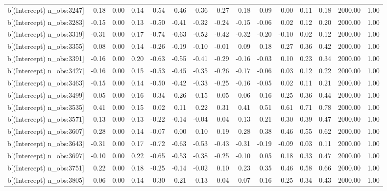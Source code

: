 \begin{table}[ht]
\begin{tabular}{rrrrrrrrrrrrrrr}
  b[(Intercept) n\_obs:3247] & -0.18 & 0.00 & 0.14 & -0.54 & -0.46 & -0.36 & -0.27 & -0.18 & -0.09 & -0.00 & 0.11 & 0.18 & 2000.00 & 1.00 \\ 
  b[(Intercept) n\_obs:3283] & -0.15 & 0.00 & 0.13 & -0.50 & -0.41 & -0.32 & -0.24 & -0.15 & -0.06 & 0.02 & 0.12 & 0.20 & 2000.00 & 1.00 \\ 
  b[(Intercept) n\_obs:3319] & -0.31 & 0.00 & 0.17 & -0.74 & -0.63 & -0.52 & -0.42 & -0.32 & -0.20 & -0.10 & 0.02 & 0.12 & 2000.00 & 1.00 \\ 
  b[(Intercept) n\_obs:3355] & 0.08 & 0.00 & 0.14 & -0.26 & -0.19 & -0.10 & -0.01 & 0.09 & 0.18 & 0.27 & 0.36 & 0.42 & 2000.00 & 1.00 \\ 
  b[(Intercept) n\_obs:3391] & -0.16 & 0.00 & 0.20 & -0.63 & -0.55 & -0.41 & -0.29 & -0.16 & -0.03 & 0.10 & 0.23 & 0.34 & 2000.00 & 1.00 \\ 
  b[(Intercept) n\_obs:3427] & -0.16 & 0.00 & 0.15 & -0.53 & -0.45 & -0.35 & -0.26 & -0.17 & -0.06 & 0.03 & 0.12 & 0.22 & 2000.00 & 1.00 \\ 
  b[(Intercept) n\_obs:3463] & -0.15 & 0.00 & 0.14 & -0.50 & -0.42 & -0.33 & -0.25 & -0.16 & -0.05 & 0.02 & 0.11 & 0.21 & 2000.00 & 1.00 \\ 
  b[(Intercept) n\_obs:3499] & 0.05 & 0.00 & 0.16 & -0.34 & -0.26 & -0.15 & -0.05 & 0.06 & 0.16 & 0.25 & 0.36 & 0.44 & 2000.00 & 1.00 \\ 
  b[(Intercept) n\_obs:3535] & 0.41 & 0.00 & 0.15 & 0.02 & 0.11 & 0.22 & 0.31 & 0.41 & 0.51 & 0.61 & 0.71 & 0.78 & 2000.00 & 1.00 \\ 
  b[(Intercept) n\_obs:3571] & 0.13 & 0.00 & 0.13 & -0.22 & -0.14 & -0.04 & 0.04 & 0.13 & 0.21 & 0.30 & 0.39 & 0.47 & 2000.00 & 1.00 \\ 
  b[(Intercept) n\_obs:3607] & 0.28 & 0.00 & 0.14 & -0.07 & 0.00 & 0.10 & 0.19 & 0.28 & 0.38 & 0.46 & 0.55 & 0.62 & 2000.00 & 1.00 \\ 
  b[(Intercept) n\_obs:3643] & -0.31 & 0.00 & 0.17 & -0.72 & -0.63 & -0.53 & -0.43 & -0.31 & -0.19 & -0.09 & 0.03 & 0.11 & 2000.00 & 1.00 \\ 
  b[(Intercept) n\_obs:3697] & -0.10 & 0.00 & 0.22 & -0.65 & -0.53 & -0.38 & -0.25 & -0.10 & 0.05 & 0.18 & 0.33 & 0.47 & 2000.00 & 1.00 \\ 
  b[(Intercept) n\_obs:3751] & 0.22 & 0.00 & 0.18 & -0.25 & -0.14 & -0.02 & 0.10 & 0.23 & 0.35 & 0.46 & 0.58 & 0.66 & 2000.00 & 1.00 \\ 
  b[(Intercept) n\_obs:3805] & 0.06 & 0.00 & 0.14 & -0.30 & -0.21 & -0.13 & -0.04 & 0.07 & 0.16 & 0.25 & 0.34 & 0.43 & 2000.00 & 1.00 \\ 

\end{tabular}
\end{table}
